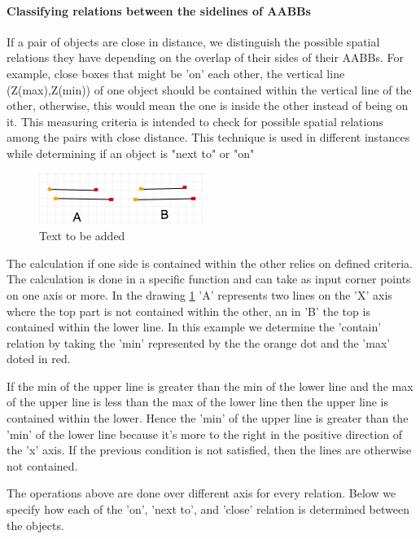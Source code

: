 \paragraph{Classifying relations between the sidelines of AABBs}

If a pair of objects are close in distance, we distinguish the possible spatial relations they have depending on the overlap of their sides of their AABBs. For example, close boxes that might be 'on' each other, the vertical line (Z(max),Z(min)) of one object should be contained within the vertical line of the other, otherwise, this would mean the one is inside the other instead of being on it. This measuring criteria is intended to check for possible spatial relations among the pairs with close distance. This technique is used in different instances while determining if an object is "next to" or "on"



\begin{figure}[H]
\centering
\includegraphics[scale=0.5]{images/contained.png}
\caption{Text to be added}
\label{fig:contained}
\end{figure}

The calculation if one side is contained within the other relies on defined criteria. The calculation is done in a specific function and  can take as input  corner points on one axis or more. In the drawing \ref{fig:contained} 'A' represents two lines on the 'X' axis where the top part is not contained within the other, an in 'B' the top is contained within the lower line. In this example we determine the 'contain' relation by taking the 'min' represented by the the orange dot and the 'max' doted in red. 

If the min of the upper line is greater than the min of the lower line and the max of the upper line is less than the max of the lower line then the upper line is contained within the lower. Hence the 'min' of the upper line is greater than the 'min' of the lower line because it's more to the right in the positive direction of the 'x' axis. If the previous condition is not satisfied, then the lines are otherwise not contained. 

The operations above are done over different axis for every relation. Below we specify how each of the 'on', 'next to', and 'close' relation is determined between the objects. 

